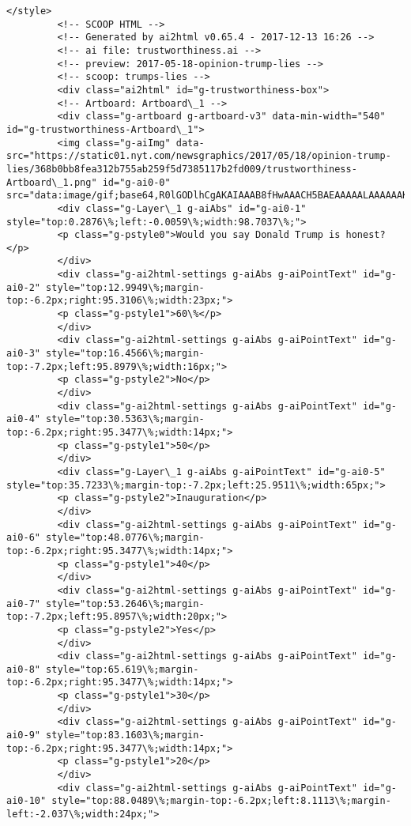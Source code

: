 \documentclass[11pt]{article}
\begin{document}
\begin{Verbatim}[commandchars=\\\{\}]
         </style>
         <!-- SCOOP HTML -->
         <!-- Generated by ai2html v0.65.4 - 2017-12-13 16:26 -->
         <!-- ai file: trustworthiness.ai -->
         <!-- preview: 2017-05-18-opinion-trump-lies -->
         <!-- scoop: trumps-lies -->
         <div class="ai2html" id="g-trustworthiness-box">
         <!-- Artboard: Artboard\_1 -->
         <div class="g-artboard g-artboard-v3" data-min-width="540" id="g-trustworthiness-Artboard\_1">
         <img class="g-aiImg" data-src="https://static01.nyt.com/newsgraphics/2017/05/18/opinion-trump-lies/368b0bb8fea312b755ab259f5d7385117b2fd009/trustworthiness-Artboard\_1.png" id="g-ai0-0" src="data:image/gif;base64,R0lGODlhCgAKAIAAAB8fHwAAACH5BAEAAAAALAAAAAAKAAoAAAIIhI+py+0PYysAOw=="/>
         <div class="g-Layer\_1 g-aiAbs" id="g-ai0-1" style="top:0.2876\%;left:-0.0059\%;width:98.7037\%;">
         <p class="g-pstyle0">Would you say Donald Trump is honest?</p>
         </div>
         <div class="g-ai2html-settings g-aiAbs g-aiPointText" id="g-ai0-2" style="top:12.9949\%;margin-top:-6.2px;right:95.3106\%;width:23px;">
         <p class="g-pstyle1">60\%</p>
         </div>
         <div class="g-ai2html-settings g-aiAbs g-aiPointText" id="g-ai0-3" style="top:16.4566\%;margin-top:-7.2px;left:95.8979\%;width:16px;">
         <p class="g-pstyle2">No</p>
         </div>
         <div class="g-ai2html-settings g-aiAbs g-aiPointText" id="g-ai0-4" style="top:30.5363\%;margin-top:-6.2px;right:95.3477\%;width:14px;">
         <p class="g-pstyle1">50</p>
         </div>
         <div class="g-Layer\_1 g-aiAbs g-aiPointText" id="g-ai0-5" style="top:35.7233\%;margin-top:-7.2px;left:25.9511\%;width:65px;">
         <p class="g-pstyle2">Inauguration</p>
         </div>
         <div class="g-ai2html-settings g-aiAbs g-aiPointText" id="g-ai0-6" style="top:48.0776\%;margin-top:-6.2px;right:95.3477\%;width:14px;">
         <p class="g-pstyle1">40</p>
         </div>
         <div class="g-ai2html-settings g-aiAbs g-aiPointText" id="g-ai0-7" style="top:53.2646\%;margin-top:-7.2px;left:95.8957\%;width:20px;">
         <p class="g-pstyle2">Yes</p>
         </div>
         <div class="g-ai2html-settings g-aiAbs g-aiPointText" id="g-ai0-8" style="top:65.619\%;margin-top:-6.2px;right:95.3477\%;width:14px;">
         <p class="g-pstyle1">30</p>
         </div>
         <div class="g-ai2html-settings g-aiAbs g-aiPointText" id="g-ai0-9" style="top:83.1603\%;margin-top:-6.2px;right:95.3477\%;width:14px;">
         <p class="g-pstyle1">20</p>
         </div>
         <div class="g-ai2html-settings g-aiAbs g-aiPointText" id="g-ai0-10" style="top:88.0489\%;margin-top:-6.2px;left:8.1113\%;margin-left:-2.037\%;width:24px;">

\end{Verbatim}
\end{document}
